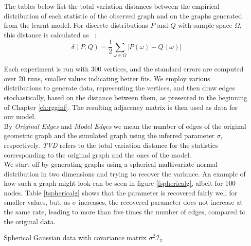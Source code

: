 \documentclass[12pt]{report}
\newcommand{\mc}[1]{\mathcal{#1}}
\newcommand{\half}{\frac{1}{2}}
\begin{document}
The tables below list the total variation distances between the empirical distribution of each statistic of the observed graph and on the graphs generated from the learnt model. For discrete distributions $P$ and $Q$ with sample space $\Omega$, this distance is calculated as ~\parencite{tvd}:
\begin{equation}
    \delta(P, Q) = \half\sum\limits_{\omega \in \Omega}|P(\omega) - Q(\omega)|
\end{equation}

Each experiment is run with 300 vertices, and the standard errors are computed over 20 runs, smaller values indicating better fits. We employ various distributions to generate data, representing the vertices, and then draw edges stochastically, based on the distance between them, as presented in the beginning of Chapter \ref{ch:rgginf}. The resulting adjacency matrix is then used as data for our model. \\

By \textit{Original Edges} and \textit{Model Edges} we mean the number of edges of the original geometric graph and the simulated graph using the inferred parameter $\sigma$, respectively. \textit{TVD} refers to the total variation distance for the statistics corresponding to the original graph and the ones of the model. \\

We start off by generating graphs using a spherical multivariate normal distribution in two dimensions and trying to recover the variance. An example of how such a graph might look can be seen in figure \ref{fsphericalg}, albeit for 100 nodes. Table \ref{tsphericalg} shows that the parameter is recovered fairly well for smaller values, but, as $\sigma$ increases, the recovered parameter does not increase at the same rate, leading to more than five times the number of edges, compared to the original data. \\

\begin{table}[!ht]
    \centering
    \tiny
    \caption{Spherical Gaussian data with covariance matrix $\sigma^2\mc{I}_2$}
    \label{tsphericalg}
\end{table}
\end{document}
